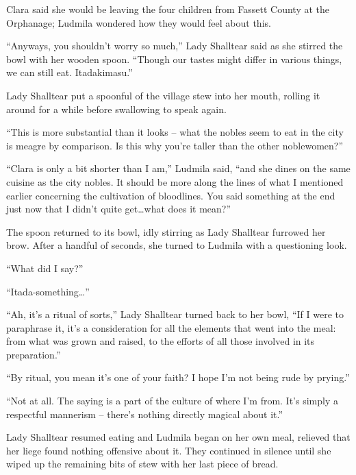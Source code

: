 Clara said she would be leaving the four children from Fassett County at the Orphanage; Ludmila wondered how they would feel about this.

 

“Anyways, you shouldn’t worry so much,” Lady Shalltear said as she stirred the bowl with her wooden spoon. “Though our tastes might differ in various things, we can still eat. Itadakimasu.”

 

Lady Shalltear put a spoonful of the village stew into her mouth, rolling it around for a while before swallowing to speak again.

 

“This is more substantial than it looks – what the nobles seem to eat in the city is meagre by comparison. Is this why you’re taller than the other noblewomen?”

 

“Clara is only a bit shorter than I am,” Ludmila said, “and she dines on the same cuisine as the city nobles. It should be more along the lines of what I mentioned earlier concerning the cultivation of bloodlines. You said something at the end just now that I didn’t quite get…what does it mean?”

 

The spoon returned to its bowl, idly stirring as Lady Shalltear furrowed her brow. After a handful of seconds, she turned to Ludmila with a questioning look.

 

“What did I say?”

 

“Itada-something…”

 

“Ah, it’s a ritual of sorts,” Lady Shalltear turned back to her bowl, “If I were to paraphrase it, it’s a consideration for all the elements that went into the meal: from what was grown and raised, to the efforts of all those involved in its preparation.”

 

“By ritual, you mean it’s one of your faith? I hope I’m not being rude by prying.”

 

“Not at all. The saying is a part of the culture of where I’m from. It’s simply a respectful mannerism – there’s nothing directly magical about it.”

 

Lady Shalltear resumed eating and Ludmila began on her own meal, relieved that her liege found nothing offensive about it. They continued in silence until she wiped up the remaining bits of stew with her last piece of bread.

